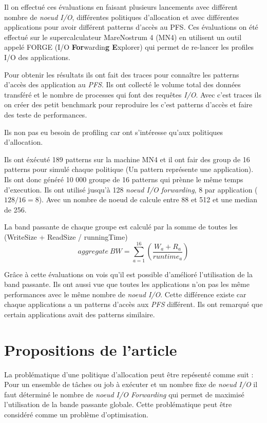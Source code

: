 \documentclass[10pt, a4paper]{article}
\begin{document}
Il on effectué ces évaluations en faisant plusieurs lancements avec différent nombre de \emph{noeud I/O}, différentes politiques d'allocation et avec différentes applications pour avoir différent patterns d'accès au PFS. Ces évaluations on été effectué sur le supercalculateur MareNostrum 4 (MN4) en utilisent un outil appelé FORGE (I/O \textbf{For}wardin\textbf{g E}xplorer) qui permet de re-lancer les profiles I/O des applications.

Pour obtenir les résultats ils ont fait des traces pour connaître les patterns d'accès des application au \emph{PFS}. Ils ont collecté le volume total des données transféré et le nombre de processes qui font des requêtes \emph{I/O}. Avec c'est traces ils on créer des petit benchmark pour reproduire les c'est patterns d'accès et faire des teste de performances.

Ils non pas eu besoin de profiling car ont s'intéresse qu'aux politiques d'allocation.

Ils ont éxécuté 189 patterns sur la machine MN4 et il ont fair des group de 16 patterns pour simulé chaque politique (Un pattern représente une application).
Ils ont donc généré 10 000 groupe de 16 patterns qui prènne le même temps d'execution.
Ils ont utilisé jusqu'à 128 \emph{noeud I/O forwarding}, 8 par application ($128/16=8$). Avec un nombre de noeud de calcule entre 88 et 512 et une median de 256.

La band passante de chaque groupe est calculé par la somme de toutes les (WriteSize + ReadSize / runningTime)
\begin{equation*}aggregate\ BW=\sum_{a=1}^{16}\left(\frac{W_{a}+R_{a}}{runtime_{a}}\right) \tag{2}\end{equation*}

Grâce à cette évaluations on vois qu'il est possible d'amélioré l'utilisation de la band passante.
Ils ont aussi vue que toutes les applications n'on pas les même performances avec le même nombre de \emph{noeud I/O}. Cette différence existe car chaque applications a un patterns d'accès aux \emph{PFS} différent. Ils ont remarqué que certain applications avait des patterns similaire.

\section{Propositions de l'article}

La problématique d'une politique d'allocation peut être repésenté comme suit :
Pour un ensemble de tâches ou job à exécuter et un nombre fixe de \emph{noeud I/O} il faut déterminé le nombre de \emph{noeud I/O Forwarding} qui permet de maximisé l'utilisation de la bande passante globale.
Cette problématique peut être considéré comme un problème d'optimisation.
\end{document}
